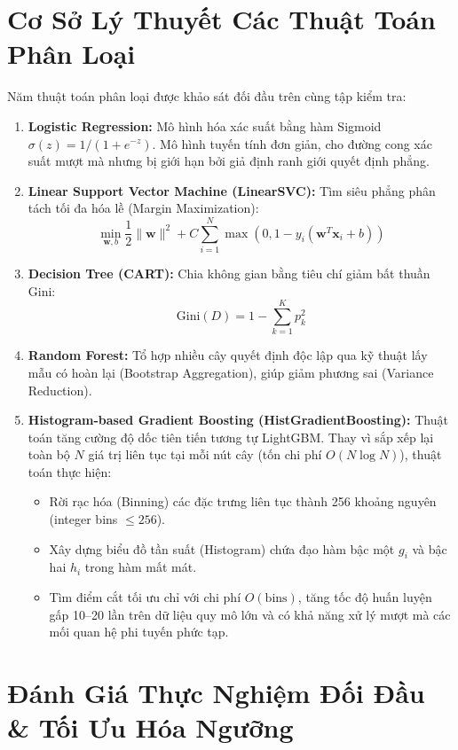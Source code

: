 \documentclass[12pt,a4paper]{report}
\begin{document}
\section{Cơ Sở Lý Thuyết Các Thuật Toán Phân Loại}
Năm thuật toán phân loại được khảo sát đối đầu trên cùng tập kiểm tra:
\begin{enumerate}[leftmargin=2em]
    \item \textbf{Logistic Regression:} Mô hình hóa xác suất bằng hàm Sigmoid $\sigma(z) = 1/(1 + e^{-z})$. Mô hình tuyến tính đơn giản, cho đường cong xác suất mượt mà nhưng bị giới hạn bởi giả định ranh giới quyết định phẳng.
    \item \textbf{Linear Support Vector Machine (LinearSVC):} Tìm siêu phẳng phân tách tối đa hóa lề (Margin Maximization):
    \begin{equation}
    \min_{\mathbf{w}, b} \frac{1}{2} \|\mathbf{w}\|^2 + C \sum_{i=1}^N \max(0, 1 - y_i(\mathbf{w}^T \mathbf{x}_i + b))
    \end{equation}
    \item \textbf{Decision Tree (CART):} Chia không gian bằng tiêu chí giảm bất thuần Gini:
    \begin{equation}
    \text{Gini}(D) = 1 - \sum_{k=1}^K p_k^2
    \end{equation}
    \item \textbf{Random Forest:} Tổ hợp nhiều cây quyết định độc lập qua kỹ thuật lấy mẫu có hoàn lại (Bootstrap Aggregation), giúp giảm phương sai (Variance Reduction).
    \item \textbf{Histogram-based Gradient Boosting (HistGradientBoosting):} Thuật toán tăng cường độ dốc tiên tiến tương tự LightGBM. Thay vì sắp xếp lại toàn bộ $N$ giá trị liên tục tại mỗi nút cây (tốn chi phí $O(N \log N)$), thuật toán thực hiện:
    \begin{itemize}
        \item Rời rạc hóa (Binning) các đặc trưng liên tục thành 256 khoảng nguyên (integer bins $\le 256$).
        \item Xây dựng biểu đồ tần suất (Histogram) chứa đạo hàm bậc một $g_i$ và bậc hai $h_i$ trong hàm mất mát.
        \item Tìm điểm cắt tối ưu chỉ với chi phí $O(\text{bins})$, tăng tốc độ huấn luyện gấp 10--20 lần trên dữ liệu quy mô lớn và có khả năng xử lý mượt mà các mối quan hệ phi tuyến phức tạp.
    \end{itemize}
\end{enumerate}

\section{Đánh Giá Thực Nghiệm Đối Đầu \& Tối Ưu Hóa Ngưỡng}
\end{document}
